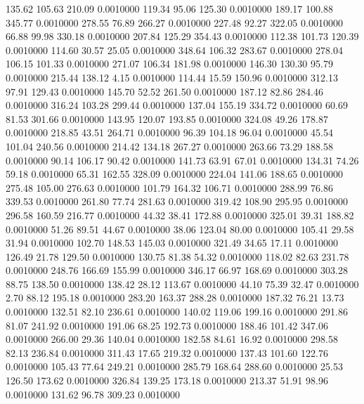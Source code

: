  135.62  105.63  210.09   0.0010000
 119.34   95.06  125.30   0.0010000
 189.17  100.88  345.77   0.0010000
 278.55   76.89  266.27   0.0010000
 227.48   92.27  322.05   0.0010000
  66.88   99.98  330.18   0.0010000
 207.84  125.29  354.43   0.0010000
 112.38  101.73  120.39   0.0010000
 114.60   30.57   25.05   0.0010000
 348.64  106.32  283.67   0.0010000
 278.04  106.15  101.33   0.0010000
 271.07  106.34  181.98   0.0010000
 146.30  130.30   95.79   0.0010000
 215.44  138.12    4.15   0.0010000
 114.44   15.59  150.96   0.0010000
 312.13   97.91  129.43   0.0010000
 145.70   52.52  261.50   0.0010000
 187.12   82.86  284.46   0.0010000
 316.24  103.28  299.44   0.0010000
 137.04  155.19  334.72   0.0010000
  60.69   81.53  301.66   0.0010000
 143.95  120.07  193.85   0.0010000
 324.08   49.26  178.87   0.0010000
 218.85   43.51  264.71   0.0010000
  96.39  104.18   96.04   0.0010000
  45.54  101.04  240.56   0.0010000
 214.42  134.18  267.27   0.0010000
 263.66   73.29  188.58   0.0010000
  90.14  106.17   90.42   0.0010000
 141.73   63.91   67.01   0.0010000
 134.31   74.26   59.18   0.0010000
  65.31  162.55  328.09   0.0010000
 224.04  141.06  188.65   0.0010000
 275.48  105.00  276.63   0.0010000
 101.79  164.32  106.71   0.0010000
 288.99   76.86  339.53   0.0010000
 261.80   77.74  281.63   0.0010000
 319.42  108.90  295.95   0.0010000
 296.58  160.59  216.77   0.0010000
  44.32   38.41  172.88   0.0010000
 325.01   39.31  188.82   0.0010000
  51.26   89.51   44.67   0.0010000
  38.06  123.04   80.00   0.0010000
 105.41   29.58   31.94   0.0010000
 102.70  148.53  145.03   0.0010000
 321.49   34.65   17.11   0.0010000
 126.49   21.78  129.50   0.0010000
 130.75   81.38   54.32   0.0010000
 118.02   82.63  231.78   0.0010000
 248.76  166.69  155.99   0.0010000
 346.17   66.97  168.69   0.0010000
 303.28   88.75  138.50   0.0010000
 138.42   28.12  113.67   0.0010000
  44.10   75.39   32.47   0.0010000
   2.70   88.12  195.18   0.0010000
 283.20  163.37  288.28   0.0010000
 187.32   76.21   13.73   0.0010000
 132.51   82.10  236.61   0.0010000
 140.02  119.06  199.16   0.0010000
 291.86   81.07  241.92   0.0010000
 191.06   68.25  192.73   0.0010000
 188.46  101.42  347.06   0.0010000
 266.00   29.36  140.04   0.0010000
 182.58   84.61   16.92   0.0010000
 298.58   82.13  236.84   0.0010000
 311.43   17.65  219.32   0.0010000
 137.43  101.60  122.76   0.0010000
 105.43   77.64  249.21   0.0010000
 285.79  168.64  288.60   0.0010000
  25.53  126.50  173.62   0.0010000
 326.84  139.25  173.18   0.0010000
 213.37   51.91   98.96   0.0010000
 131.62   96.78  309.23   0.0010000

